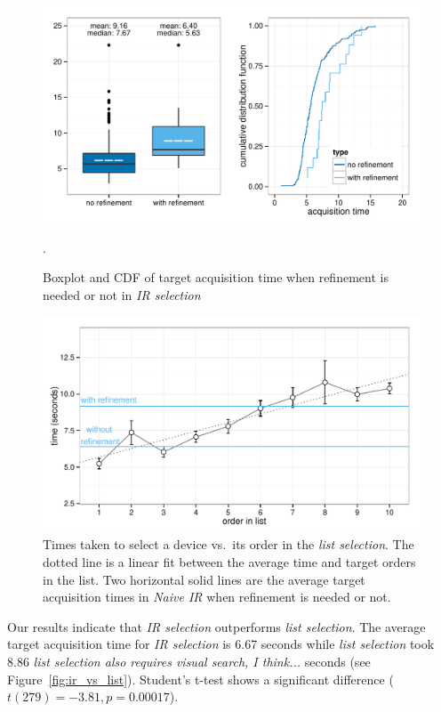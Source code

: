 \begin{figure}[t]
\centering
\includegraphics[width=1.09\columnwidth]{figures/result_study1b.pdf}
\caption{Boxplot and CDF of target acquisition time when refinement is needed or not in {\em IR selection}}.
\label{fig:with_without_refinement}
\end{figure}

\begin{figure}[t]
\centering
\includegraphics[width=1.0\columnwidth]{figures/result_study1c.pdf}
\caption{Times taken to select a device vs.~its order in the {\em list selection}. The dotted line is a linear fit between the average time and target orders in the list. Two horizontal solid lines are the average target acquisition times in {\em Naive IR} when refinement is needed or not.}
\label{fig:time-vs-list-order}
\end{figure}

Our results indicate that {\em IR selection} outperforms {\em list selection}.  The average target acquisition time for {\em IR selection} is 6.67 seconds 
while {\em list selection} took 8.86 {\em list selection also requires visual search, I think...} seconds (see Figure~\ref{fig:ir_vs_list}). Student's t-test shows a significant difference ($t(279)=-3.81, p=0.00017$).

